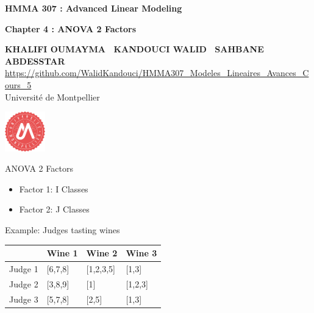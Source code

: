 \documentclass[unknownkeysallowed]{beamer}
\begin{document}



\begin{frame}[noframenumbering]
\thispagestyle{empty}
\bigskip
\bigskip
\begin{center}{
\LARGE\color{marron}
\textbf{HMMA 307 : Advanced Linear Modeling}
\textbf{ }\\
\vspace{0.5cm}
}

\color{marron}
\textbf{Chapter 4 : ANOVA 2 Factors}
\end{center}

\vspace{0.5cm}

\begin{center}
\textbf{KHALIFI OUMAYMA \ KANDOUCI WALID \ SAHBANE ABDESSTAR } \\
\vspace{0.1cm}
\url{https://github.com/WalidKandouci/HMMA307_Modeles_Lineaires_Avances_Cours_5}\\
\vspace{0.5cm}
Université de Montpellier \\
\end{center}

\centering
\includegraphics[width=0.13\textwidth]{Logo.pdf}
\end{frame}

\begin{frame}{ANOVA 2 Factors}
\begin{itemize}
    \item Factor 1: I Classes
    \item Factor 2: J Classes
\end{itemize}

Example: Judges tasting wines

\begin{center}
\begin{tabular}{ |p{1.5cm}|p{1.5cm}|p{1.5cm}|p{1.5cm}|  }
\hline
 & Wine 1 & Wine 2 & Wine 3 \\
\hline
Judge 1 & [6,7,8] & [1,2,3,5] & [1,3] \\
\hline
Judge 2 & [3,8,9] & [1] & [1,2,3] \\
\hline
Judge 3 & [5,7,8] & [2,5] & [1,3] \\
\hline
\end{tabular}
\end{center}
\end{frame}
\end{document}
